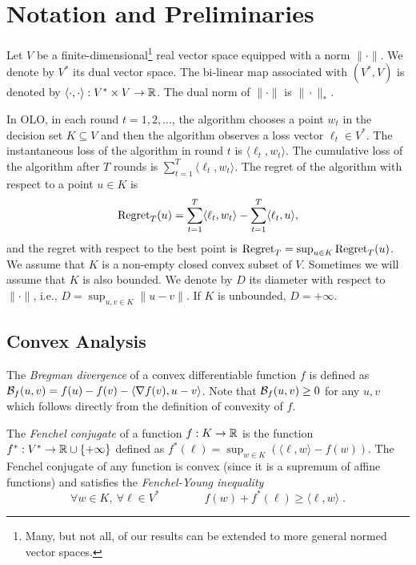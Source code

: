 \section{Notation and Preliminaries}
\label{section:preliminaries}

Let $V$ be a finite-dimensional\footnote{Many, but not all, of our
results can be extended to more general normed vector spaces.} real vector
space equipped with a norm $\|\cdot\|$. We denote by $V^*$ its dual vector
space.  The bi-linear map associated with $(V^*, V)$ is denoted by $\langle
\cdot, \cdot \rangle:V^* \times V \to \mathbb{R}$.  The dual norm of $\|\cdot\|$ is
$\|\cdot\|_*$.

In OLO, in each round $t=1,2,\dots$, the algorithm chooses a point $w_t$ in the
decision set $K \subseteq V$ and then the algorithm observes a loss vector
$\ell_t \in V^*$. The instantaneous loss of the algorithm in round $t$ is
$\langle \ell_t, w_t \rangle$. The cumulative loss of the algorithm after $T$
rounds is $\sum_{t=1}^T \langle \ell_t, w_t \rangle$.  The regret of the
algorithm with respect to a point $u \in K$ is
$$
\operatorname{Regret}_T(u) = \sum_{t=1}^T \langle \ell_t, w_t \rangle - \sum_{t=1}^T \langle \ell_t, u \rangle,
$$
and the regret with respect to the best point is $\operatorname{Regret}_T= \sup_{u \in K}
\operatorname{Regret}_T(u)$.  We assume that $K$ is a non-empty closed convex subset of $V$.
Sometimes we will assume that $K$ is also bounded. We denote by $D$ its
diameter with respect to $\|\cdot\|$, i.e., $D = \sup_{u,v \in K} \|u - v\|$.
If $K$ is unbounded, $D = +\infty$.

\subsection{Convex Analysis}

The \emph{Bregman divergence} of a convex differentiable function $f$ is
defined as $\mathcal{B}_f(u,v) = f(u) - f(v) - \langle \nabla f(v), u - v \rangle$.
Note that $\mathcal{B}_f(u,v) \ge 0$ for any $u,v$ which follows directly from the
definition of convexity of $f$.

The \emph{Fenchel conjugate} of a function $f:K \to \mathbb{R}$ is the function
$f^*:V^* \to \mathbb{R} \cup \{+\infty\}$ defined as $f^*(\ell) = \sup_{w \in K} \left(
\langle \ell, w \rangle - f(w) \right)$.  The Fenchel conjugate of any function
is convex (since it is a supremum of affine functions) and satisfies
 the \emph{Fenchel-Young inequality}
$$
\forall w \in K, \ \forall \ell \in V^* \qquad \qquad
f(w) + f^*(\ell) \ge \langle \ell, w \rangle \; .
$$

